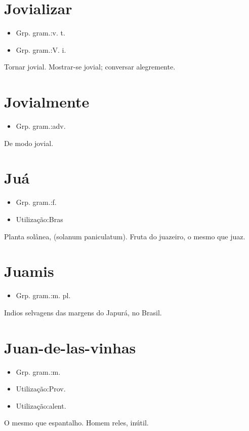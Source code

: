 \documentclass{article}
\begin{document}
\section{Jovializar}
\begin{itemize}
\item {Grp. gram.:v. t.}
\end{itemize}
\begin{itemize}
\item {Grp. gram.:V. i.}
\end{itemize}
Tornar jovial.
Mostrar-se jovial; conversar alegremente.
\section{Jovialmente}
\begin{itemize}
\item {Grp. gram.:adv.}
\end{itemize}
De modo jovial.
\section{Juá}
\begin{itemize}
\item {Grp. gram.:f.}
\end{itemize}
\begin{itemize}
\item {Utilização:Bras}
\end{itemize}
Planta solânea, (\textunderscore solanum paniculatum\textunderscore ).
Fruta do juazeiro, o mesmo que \textunderscore juaz\textunderscore .
\section{Juamis}
\begin{itemize}
\item {Grp. gram.:m. pl.}
\end{itemize}
Indios selvagens das margens do Japurá, no Brasil.
\section{Juan-de-las-vinhas}
\begin{itemize}
\item {Grp. gram.:m.}
\end{itemize}
\begin{itemize}
\item {Utilização:Prov.}
\end{itemize}
\begin{itemize}
\item {Utilização:alent.}
\end{itemize}
O mesmo que \textunderscore espantalho\textunderscore .
Homem reles, inútil.
\end{document}
